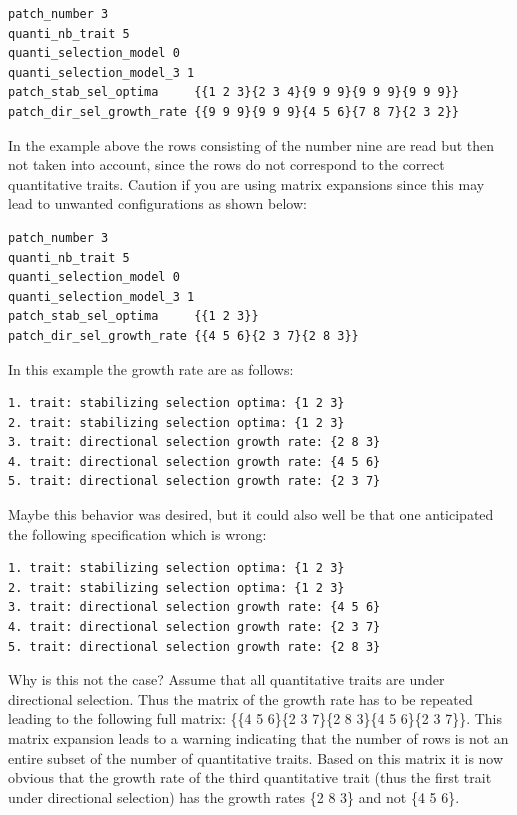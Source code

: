 \documentclass[letterpaper,12pt,oneside]{book}
\begin{document}
\begin{appendices}
\begin{lstlisting}[frame=single]
patch_number 3
quanti_nb_trait 5 
quanti_selection_model 0	
quanti_selection_model_3 1
patch_stab_sel_optima     {{1 2 3}{2 3 4}{9 9 9}{9 9 9}{9 9 9}}
patch_dir_sel_growth_rate {{9 9 9}{9 9 9}{4 5 6}{7 8 7}{2 3 2}}
\end{lstlisting}
In the example above the rows consisting of the number nine are read but then not taken into account, since the rows do not correspond to the correct quantitative traits. Caution if you are using matrix expansions since this may lead to unwanted configurations as shown below:
\begin{lstlisting}[frame=single]
patch_number 3
quanti_nb_trait 5 
quanti_selection_model 0	
quanti_selection_model_3 1
patch_stab_sel_optima     {{1 2 3}}
patch_dir_sel_growth_rate {{4 5 6}{2 3 7}{2 8 3}}
\end{lstlisting}
In this example the growth rate are as follows:
\begin{lstlisting}[frame=single]
1. trait: stabilizing selection optima: {1 2 3}
2. trait: stabilizing selection optima: {1 2 3}
3. trait: directional selection growth rate: {2 8 3}
4. trait: directional selection growth rate: {4 5 6}
5. trait: directional selection growth rate: {2 3 7}
\end{lstlisting}
Maybe this behavior was desired, but it could also well be that one anticipated the following specification which is wrong:
\begin{lstlisting}[frame=single]
1. trait: stabilizing selection optima: {1 2 3}
2. trait: stabilizing selection optima: {1 2 3}
3. trait: directional selection growth rate: {4 5 6}
4. trait: directional selection growth rate: {2 3 7}
5. trait: directional selection growth rate: {2 8 3}
\end{lstlisting}
Why is this not the case? Assume that all quantitative traits are under directional selection. Thus the matrix of the growth rate has to be repeated leading to the following full matrix: \{\{4 5 6\}\{2 3 7\}\{2 8 3\}\{4 5 6\}\{2 3 7\}\}. This matrix expansion leads to a warning indicating that the number of rows is not an entire subset of the number of quantitative traits. Based on this matrix it is now obvious that the growth rate of the third quantitative trait (thus the first trait under directional selection) has the growth rates \{2 8 3\} and not \{4 5 6\}.


\end{appendices}
\end{document}
